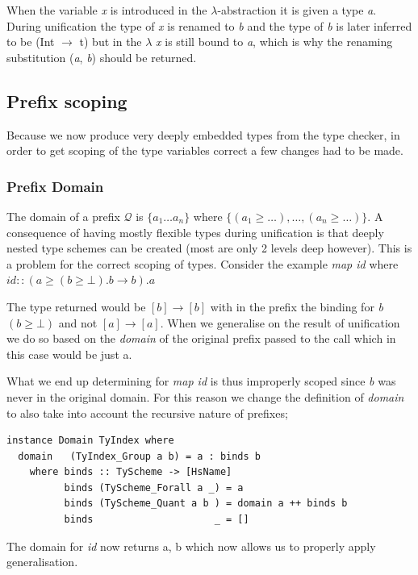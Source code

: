 \documentclass[12pt, a4paper, oneside]{article}
\begin{document}
When the variable \emph{x} is introduced in the $\lambda$-abstraction it is given a type \emph{a}. During unification the type of \emph{x} is renamed to \emph{b} and the type of \emph{b} is later inferred to be (Int $\rightarrow$ t) but in the $\lambda$ \emph{x} is still bound to \emph{a}, which is why the renaming substitution (\emph{a}, \emph{b}) should be returned.

\subsection{Prefix scoping}
Because we now produce very deeply embedded types from the type checker, in order to get scoping of the type variables correct a few changes had to be made.

\subsubsection{Prefix Domain}
The domain of a prefix $\mathcal{Q}$ is $\{a_1\ldots a_n\}$ where $\{(a_1 \geq \ldots) , \ldots , (a_n \geq \ldots)\}$. A consequence of having mostly flexible types during unification is that deeply nested type schemes can be created (most are only 2 levels deep however). This is a problem for the correct scoping of types. Consider the example \emph{map id} where $id :: (a \geq (b \geq \bot). b \rightarrow b). a$

The type returned would be $[b] \rightarrow [b]$ with in the prefix the binding for \emph{b} $(b \geq \bot)$ and not $[a] \rightarrow [a]$. When we generalise on the result of unification we do so based on the \emph{domain} of the original prefix passed to the call which in this case would be just {a}. 

What we end up determining for \emph{map id} is thus improperly scoped since \emph{b} was never in the original domain. For this reason we change the definition of \emph{domain} to also take into account the recursive nature of prefixes;

\begin{lstlisting}
instance Domain TyIndex where
  domain   (TyIndex_Group a b) = a : binds b
    where binds :: TyScheme -> [HsName]
          binds (TyScheme_Forall a _) = a
          binds (TyScheme_Quant a b ) = domain a ++ binds b
          binds                     _ = []
\end{lstlisting}

The domain for \emph{id} now returns {a, b} which now allows us to properly apply generalisation.
\end{document}
